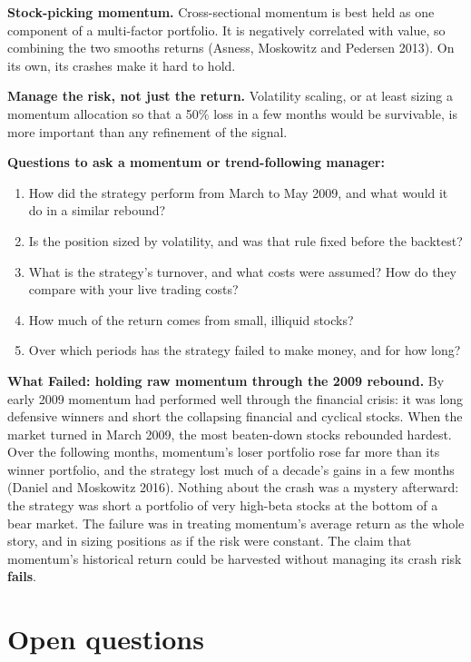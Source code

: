 \textbf{Stock-picking momentum.} Cross-sectional momentum is best held as one component of a multi-factor portfolio. It is negatively correlated with value, so combining the two smooths returns (Asness, Moskowitz and Pedersen 2013). On its own, its crashes make it hard to hold.

\textbf{Manage the risk, not just the return.} Volatility scaling, or at least sizing a momentum allocation so that a 50\% loss in a few months would be survivable, is more important than any refinement of the signal.

\textbf{Questions to ask a momentum or trend-following manager:}

\begin{enumerate}
  \item How did the strategy perform from March to May 2009, and what would it do in a similar rebound?
  \item Is the position sized by volatility, and was that rule fixed before the backtest?
  \item What is the strategy's turnover, and what costs were assumed? How do they compare with your live trading costs?
  \item How much of the return comes from small, illiquid stocks?
  \item Over which periods has the strategy failed to make money, and for how long?
\end{enumerate}

\begin{callout}
\textbf{What Failed: holding raw momentum through the 2009 rebound.} By early 2009 momentum had performed well through the financial crisis: it was long defensive winners and short the collapsing financial and cyclical stocks. When the market turned in March 2009, the most beaten-down stocks rebounded hardest. Over the following months, momentum's loser portfolio rose far more than its winner portfolio, and the strategy lost much of a decade's gains in a few months (Daniel and Moskowitz 2016). Nothing about the crash was a mystery afterward: the strategy was short a portfolio of very high-beta stocks at the bottom of a bear market. The failure was in treating momentum's average return as the whole story, and in sizing positions as if the risk were constant. The claim that momentum's historical return could be harvested without managing its crash risk \textbf{fails}.
\end{callout}

\section{Open questions}
\label{sec:09-open}

